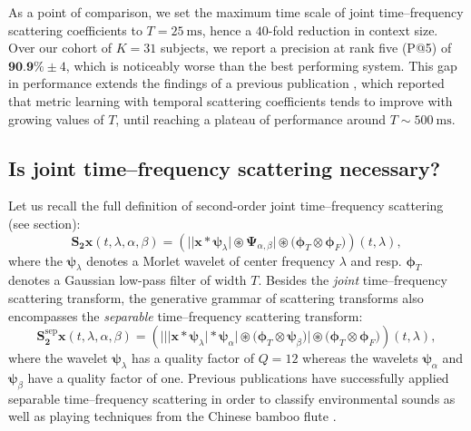 \documentclass{bmcart}
\newcommand{\lnameref}[1]{%
\bgroup
\let\nmu\MakeLowercase
\nameref{#1}\egroup}
\newcommand{\nmu}{}
\begin{document}
As a point of comparison, we set the maximum time scale of joint time--frequency scattering coefficients to $T=\SI{25}{\milli\second}$, hence a $40$-fold reduction in context size.
Over our cohort of $K=31$ subjects, we report a precision at rank five (P@5) of $\textbf{90.9\%} \pm 4$, which is noticeably worse than the best performing system.
This gap in performance extends the findings of a previous publication \cite{lostanlen2018extended}, which reported that metric learning with temporal scattering coefficients tends to improve with growing values of $T$, until reaching a plateau of performance around $T\sim\SI{500}{\milli\second}$.


\subsection*{Is joint time--frequency scattering necessary?}

Let us recall the full definition of second-order joint time--frequency scattering (see \lnameref{sec:methods} section):
\begin{equation}
\mathbf{S_2}\boldsymbol{x}(t,\lambda,\alpha,\beta) =
\left(
\Big\vert
\big\vert
\boldsymbol{x} \ast \boldsymbol{\psi}_{\lambda}
\big\vert
\circledast
\boldsymbol{\Psi}_{\alpha,\beta}
\Big\vert
\circledast
\big(\boldsymbol{\phi}_{T} \otimes \boldsymbol{\phi}_{F})
\right)(t,\lambda),
\label{eq:joint-scattering}
\end{equation}
where the $\boldsymbol{\psi}_{\lambda}$ denotes a Morlet wavelet of center frequency $\lambda$ and resp. $\boldsymbol{\phi}_T$ denotes a Gaussian low-pass filter of width $T$.
Besides the \emph{joint} time--frequency scattering transform, the generative grammar of scattering transforms \cite{lostanlen2019chapter} also encompasses the \emph{separable} time--frequency scattering transform:
\begin{equation}
\mathbf{S_2^{\mathrm{sep}}}\boldsymbol{x}(t,\lambda,\alpha,\beta) =
\left(
\bigg\vert
\Big\vert
\big\vert
\boldsymbol{x} \ast \boldsymbol{\psi}_{\lambda}
\big\vert
\ast
\boldsymbol{\psi}_{\alpha}
\Big\vert
\circledast
\big(\boldsymbol{\phi}_{T} \otimes \boldsymbol{\psi}_{\beta}\big)
\bigg\vert
\circledast
\big(\boldsymbol{\phi}_{T} \otimes \boldsymbol{\phi}_F\big)
\right)(t, \lambda),
\label{eq:separable-scattering}
\end{equation}
where the wavelet $\boldsymbol{\psi}_{\lambda}$ has a quality factor of $Q=12$ whereas the wavelets $\boldsymbol{\psi}_{\alpha}$ and $\boldsymbol{\psi}_{\beta}$ have a quality factor of one.
Previous publications have successfully applied separable time--frequency scattering in order to classify environmental sounds \cite{bauge2013icassp} as well as playing techniques from the Chinese bamboo flute \cite{wang2019ismir}.
\end{document}
